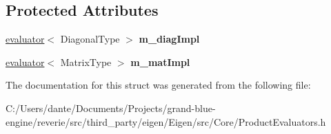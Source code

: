 \subsection*{Protected Attributes}
\begin{DoxyCompactItemize}
\item 
\mbox{\label{struct_eigen_1_1internal_1_1diagonal__product__evaluator__base_aac89e831a382ebe6172a2cc32e3159ac}} 
\mbox{\hyperlink{struct_eigen_1_1internal_1_1evaluator}{evaluator}}$<$ Diagonal\+Type $>$ {\bfseries m\+\_\+diag\+Impl}
\item 
\mbox{\label{struct_eigen_1_1internal_1_1diagonal__product__evaluator__base_ab40d6e41275ebc97d46700e5b2f562ce}} 
\mbox{\hyperlink{struct_eigen_1_1internal_1_1evaluator}{evaluator}}$<$ Matrix\+Type $>$ {\bfseries m\+\_\+mat\+Impl}
\end{DoxyCompactItemize}


The documentation for this struct was generated from the following file\+:\begin{DoxyCompactItemize}
\item 
C\+:/\+Users/dante/\+Documents/\+Projects/grand-\/blue-\/engine/reverie/src/third\+\_\+party/eigen/\+Eigen/src/\+Core/Product\+Evaluators.\+h\end{DoxyCompactItemize}
